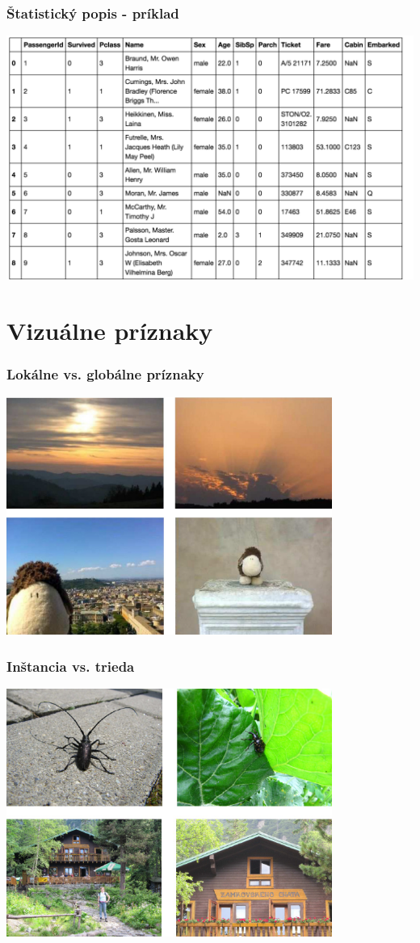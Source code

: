 \documentclass{beamer}
\begin{document}
\begin{frame}
\frametitle{Štatistický popis - príklad}
\includegraphics[width=\textwidth]{titanic.png}
\end{frame}

\section{Vizuálne príznaky}

\begin{frame}
\frametitle{Lokálne vs. globálne príznaky}
\centering
\includegraphics[width=0.8\textwidth]{locvglob.png}
\end{frame}

\begin{frame}
\frametitle{Inštancia vs. trieda}
\centering
\includegraphics[width=0.8\textwidth]{instance.png}
\end{frame}
\end{document}
